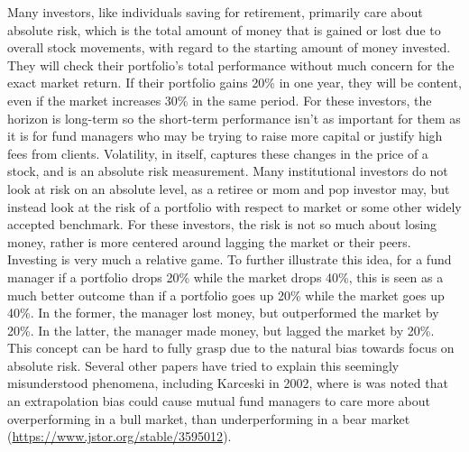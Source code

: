 \documentclass[12pt,twoside]{reedthesis}
\theoremstyle{definition}
\theoremstyle{definition}
\theoremstyle{definition}
\theoremstyle{remark}
\begin{document}
Many investors, like individuals saving for retirement, primarily care
about absolute risk, which is the total amount of money that is gained
or lost due to overall stock movements, with regard to the starting
amount of money invested. They will check their portfolio's total
performance without much concern for the exact market return. If their
portfolio gains 20\% in one year, they will be content, even if the
market increases 30\% in the same period. For these investors, the
horizon is long-term so the short-term performance isn't as important
for them as it is for fund managers who may be trying to raise more
capital or justify high fees from clients. Volatility, in itself,
captures these changes in the price of a stock, and is an absolute risk
measurement. Many institutional investors do not look at risk on an
absolute level, as a retiree or mom and pop investor may, but instead
look at the risk of a portfolio with respect to market or some other
widely accepted benchmark. For these investors, the risk is not so much
about losing money, rather is more centered around lagging the market or
their peers. Investing is very much a relative game. To further
illustrate this idea, for a fund manager if a portfolio drops 20\% while
the market drops 40\%, this is seen as a much better outcome than if a
portfolio goes up 20\% while the market goes up 40\%. In the former, the
manager lost money, but outperformed the market by 20\%. In the latter,
the manager made money, but lagged the market by 20\%. This concept can
be hard to fully grasp due to the natural bias towards focus on absolute
risk. Several other papers have tried to explain this seemingly
misunderstood phenomena, including Karceski in 2002, where is was noted
that an extrapolation bias could cause mutual fund managers to care more
about overperforming in a bull market, than underperforming in a bear
market (\url{https://www.jstor.org/stable/3595012}).
\end{document}
